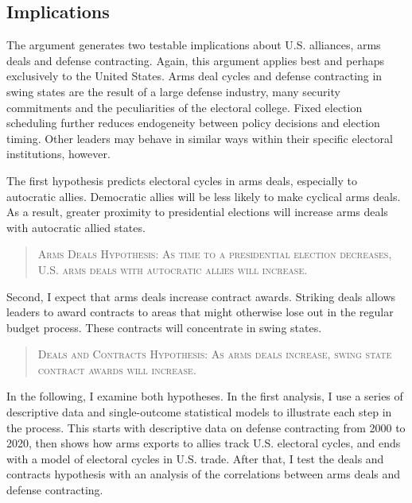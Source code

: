 \documentclass[12pt]{article}
\begin{document}

\subsection{Implications}



The argument generates two testable implications about U.S. alliances, arms deals and defense contracting. 
Again, this argument applies best and perhaps exclusively to the United States.  
Arms deal cycles and defense contracting in swing states are the result of a large defense industry, many security commitments and the peculiarities of the electoral college. 
Fixed election scheduling further reduces endogeneity between policy decisions and election timing. 
Other leaders may behave in similar ways within their specific electoral institutions, however. 


The first hypothesis predicts electoral cycles in arms deals, especially to autocratic allies.
Democratic allies will be less likely to make cyclical arms deals. 
As a result, greater proximity to presidential elections will increase arms deals with autocratic allied states. 


\begin{quote}
\textsc{Arms Deals Hypothesis: As time to a presidential election decreases, U.S. arms deals with autocratic allies will increase.}
\end{quote}


Second, I expect that arms deals increase contract awards.
Striking deals allows leaders to award contracts to areas that might otherwise lose out in the regular budget process. 
These contracts will concentrate in swing states. 


\begin{quote}
\textsc{Deals and Contracts Hypothesis: As arms deals increase, swing state contract awards will increase.}
\end{quote}


In the following, I examine both hypotheses. 
In the first analysis, I use a series of descriptive data and single-outcome statistical models to illustrate each step in the process.
This starts with descriptive data on defense contracting from 2000 to 2020, then shows how arms exports to allies track U.S. electoral cycles, and ends with a model of electoral cycles in U.S. trade. 
After that, I test the deals and contracts hypothesis with an analysis of the correlations between arms deals and defense contracting. 
\end{document}
